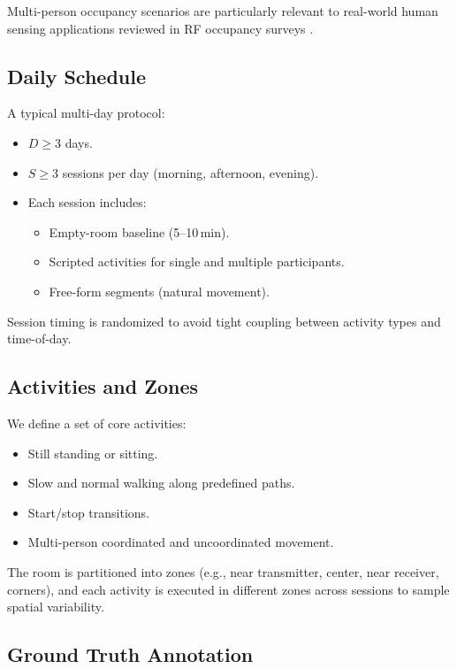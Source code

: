 \documentclass[11pt,a4paper]{article}
\begin{document}
Multi-person occupancy scenarios are particularly relevant to real-world human sensing applications reviewed in RF occupancy surveys \cite{shahbazian2023human}.

\subsection{Daily Schedule}

A typical multi-day protocol:

\begin{itemize}[leftmargin=*]
\item $D \geq 3$ days.
\item $S \geq 3$ sessions per day (morning, afternoon, evening).
\item Each session includes:
  \begin{itemize}
  \item Empty-room baseline (5--10\,min).
  \item Scripted activities for single and multiple participants.
  \item Free-form segments (natural movement).
  \end{itemize}
\end{itemize}

Session timing is randomized to avoid tight coupling between activity types and time-of-day.

\subsection{Activities and Zones}

We define a set of core activities:

\begin{itemize}[leftmargin=*]
\item Still standing or sitting.
\item Slow and normal walking along predefined paths.
\item Start/stop transitions.
\item Multi-person coordinated and uncoordinated movement.
\end{itemize}

The room is partitioned into zones (e.g., near transmitter, center, near receiver, corners), and each activity is executed in different zones across sessions to sample spatial variability.

\subsection{Ground Truth Annotation}
\end{document}
